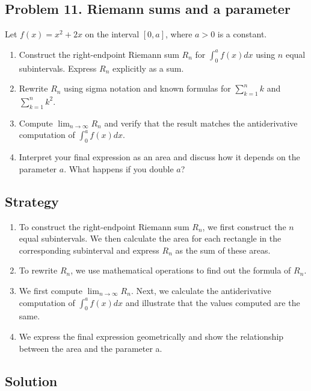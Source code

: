 \subsection{Problem 11. Riemann sums and a parameter}
Let $f(x)=x^{2}+2x$ on the interval $[0, a]$, where $a>0$ is a constant.

\begin{enumerate}[label=(\alph*)]
    \item Construct the right-endpoint Riemann sum $R_{n}$ for $\displaystyle\int_{0}^{a}f(x)dx$ using $n$ equal subintervals. Express $R_{n}$ explicitly as a sum.
    \item Rewrite $R_{n}$ using sigma notation and known formulas for $\sum_{k=1}^{n}k$ and $\sum_{k=1}^{n}k^{2}$.
    \item Compute $\lim_{n\rightarrow\infty}R_{n}$ and verify that the result matches the antiderivative computation of $\displaystyle\int_{0}^{a}f(x)dx$.
    \item Interpret your final expression as an area and discuss how it depends on the parameter $a$. What happens if you double $a$?
\end{enumerate}

\subsection*{Strategy}
\begin{enumerate}[label = (\alph*)]
    \item To construct the right-endpoint Riemann sum $R_n$, we first construct the $n$ equal subintervals. We then calculate the area for each rectangle in the corresponding subinterval and express $R_n$ as the sum of these areas.
    \item To rewrite $R_n$, we use mathematical operations to find out the formula of $R_n$.
    \item We first compute $\lim_{n\to\infty} R_{n}$. Next, we calculate the antiderivative computation of $\int_0^af(x)dx$ and illustrate that the values computed are the same.
    \item We express the final expression geometrically and show the relationship between the area and the parameter a.
\end{enumerate}
\subsection*{Solution}

